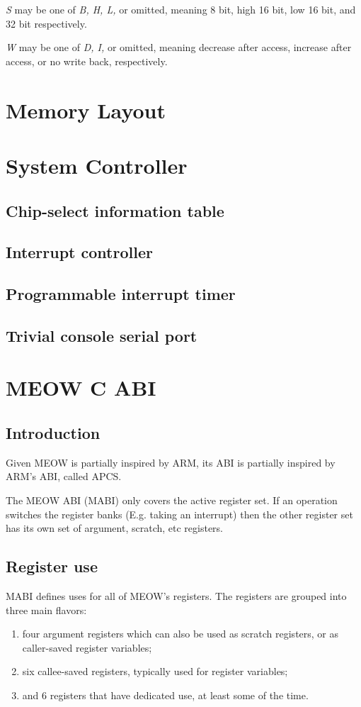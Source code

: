 \documentclass[a4paper,twoside,openany]{book}
\begin{document}
	\emph{S} may be one of \emph{B, H, L,} or omitted, meaning 8 bit, high 16 bit,
	low 16 bit, and 32 bit respectively.

	\emph{W} may be one of \emph{D, I,} or omitted, meaning decrease after access,
	increase after access, or no write back, respectively.
    

  \chapter{Memory Layout}
  
  \chapter{System Controller}
    \section{Chip-select information table}
    \section{Interrupt controller}
    \section{Programmable interrupt timer}
    \section{Trivial console serial port}
    
  \chapter{MEOW C ABI}
    \section{Introduction}
      Given MEOW is partially inspired by ARM, its ABI is partially inspired by
      ARM's ABI, called APCS.

      The MEOW ABI (MABI) only covers the active register set. If an operation
      switches the register banks (E.g. taking an interrupt) then the other
      register set has its own set of argument, scratch, etc registers.
    
    \section{Register use}
      MABI defines uses for all of MEOW's registers.  The registers are grouped
      into three main flavors:
      \begin{enumerate}
        \item four argument registers which can also be used as scratch 
          registers, or as caller-saved register variables;
        \item six callee-saved registers, typically used for register variables;
        \item and 6 registers that have dedicated use, at least some of
          the time.
      \end{enumerate}
      
\end{document}
